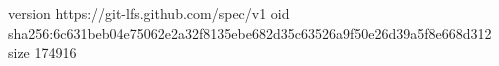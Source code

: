 version https://git-lfs.github.com/spec/v1
oid sha256:6c631beb04e75062e2a32f8135ebe682d35c63526a9f50e26d39a5f8e668d312
size 174916
